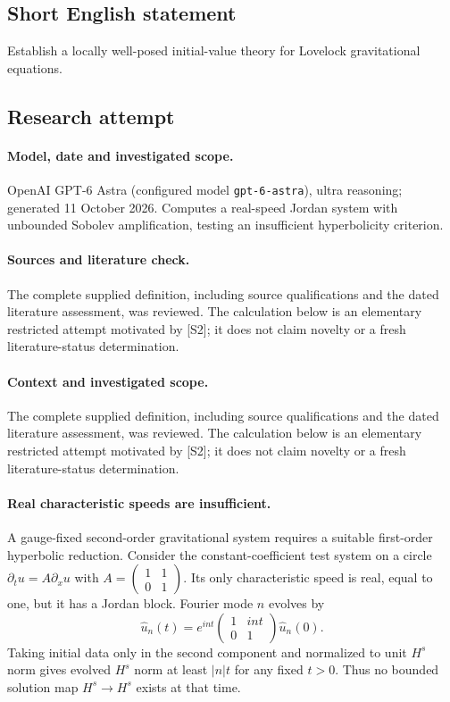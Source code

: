 \documentclass[11pt]{article}
\begin{document}
\subsection{Short English statement}
Establish a locally well-posed initial-value theory for Lovelock gravitational equations.
\subsection{Research attempt}
\paragraph{Model, date and investigated scope.}
OpenAI GPT-6 Astra (configured model \texttt{gpt-6-astra}), ultra reasoning; generated 11 October 2026. Computes a real-speed Jordan system with unbounded Sobolev amplification, testing an insufficient hyperbolicity criterion.

\paragraph{Sources and literature check.}
The complete supplied definition, including source qualifications and the dated literature assessment, was reviewed. The calculation below is an elementary restricted attempt motivated by [S2]; it does not claim novelty or a fresh literature-status determination.

\paragraph{Context and investigated scope.} The complete supplied definition, including source qualifications and the dated literature assessment, was reviewed. The calculation below is an elementary restricted attempt motivated by [S2]; it does not claim novelty or a fresh literature-status determination.

\paragraph{Real characteristic speeds are insufficient.} A gauge-fixed second-order gravitational system requires a suitable first-order hyperbolic reduction. Consider the constant-coefficient test system on a circle $\partial_tu=A\partial_xu$ with $A=\left(\begin{smallmatrix}1&1\\0&1\end{smallmatrix}\right)$. Its only characteristic speed is real, equal to one, but it has a Jordan block. Fourier mode $n$ evolves by
\[
 \widehat u_n(t)=e^{int}\begin{pmatrix}1&int\\0&1\end{pmatrix}\widehat u_n(0).
\]
Taking initial data only in the second component and normalized to unit $H^s$ norm gives evolved $H^s$ norm at least $|n|t$ for any fixed $t>0$. Thus no bounded solution map $H^s\to H^s$ exists at that time.
\end{document}
